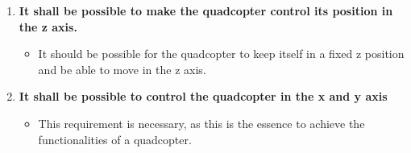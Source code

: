 \begin{enumerate}[label=\textbf{\arabic*})]
\item \textbf{It shall be possible to make the quadcopter control its position in the z axis.}
\begin{itemize}
\item[] It should be possible for the quadcopter to keep itself in a fixed z position  and be able to move in the z axis.
\end{itemize}

\item \textbf{It shall be possible to control the quadcopter in the x and y axis}
\begin{itemize}
\item[] This requirement is necessary, as this is the essence to achieve the functionalities of a quadcopter.
\end{itemize}

\end{enumerate}




























